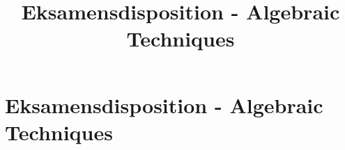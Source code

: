 
\title{Eksamensdisposition - Algebraic Techniques}


\maketitle



\newpage
\section{Eksamensdisposition - Algebraic Techniques}







